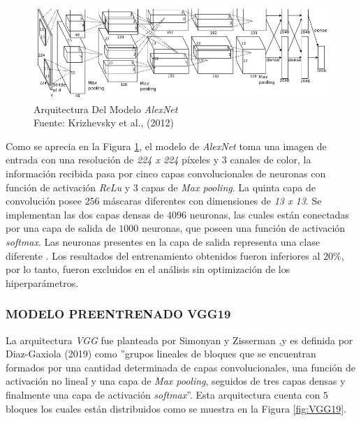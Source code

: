 \begin{figure}[ht]
	\centering
	\includegraphics[scale=0.75]{Figs/5.png}
	\caption{Arquitectura Del Modelo \textit{AlexNet} \\ Fuente: Krizhevsky et al., (2012)}
	\label{fig:AlexNet}
\end{figure}

Como se aprecia en la Figura \ref{fig:AlexNet}, el modelo de \textit{AlexNet} toma una imagen de entrada con una resolución de \textit{224 x 224} píxeles y $3$ canales de color, la información recibida pasa por cinco capas convolucionales de neuronas con función de activación \textit{ReLu} y $3$ capas de \textit{Max pooling}. La quinta capa de convolución posee $256$ máscaras diferentes con dimensiones de \textit{13 x 13}. Se implementan las dos capas densas de $4096$ neuronas, las cuales están conectadas  por una capa de salida de $1000$ neuronas, que poseen una función de activación \textit{softmax}. Las neuronas presentes en la capa de salida representa una clase diferente \cite{alex}. Los resultados del entrenamiento obtenidos fueron inferiores al $20\%$, por lo tanto, fueron excluidos en el análisis sin optimización de los hiperparámetros.


\subsubsection{\MakeUppercase{Modelo preentrenado VGG19}}

La arquitectura \textit{VGG} fue planteada por Simonyan y Zisserman \cite{simonyan2014very},y es definida por Diaz-Gaxiola (2019) como ''grupos lineales de bloques que se encuentran formados por una cantidad determinada de capas convolucionales, una función de activación no lineal y una capa de \textit{Max pooling}, seguidos de tres capas densas y finalmente una capa de activación \textit{softmax}''. Esta arquitectura cuenta con $5$ bloques los cuales están distribuidos como se muestra en la Figura \ref{fig:VGG19}.				

